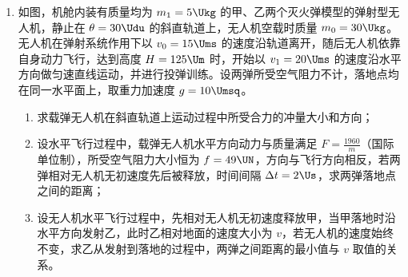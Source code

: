\documentclass[\gkver]{gaokaozhenti}
\begin{document}
\begin{enumerate}
{可知小球做加速度减小的加速运动，小球从静止释放时加速度为 $g$，小球运动到 M 点加恒定匀强电场时有 $qE+kv_{0}-mg=ma_{\max}$

解得 $a_{\max}=2g>g$

则小球的最大加速度大小为 $2g$。

（3）对小球从 M 点运动到 N 点的过程，由动能定理有 $qU_{MN}-mgh-W_{f}=0$

其中 $U_{MN}=Eh$

联立解得 M、N 两点间的电势差为 $U_{MN}=\frac{2W_{f}}{q}$。
}
\item
如图，机舱内装有质量均为 $m_{1}=5\Ukg$ 的甲、乙两个灭火弹模型的弹射型无人机，静止在 $\theta=30\Udu$ 的斜直轨道上，无人机空载时质量 $m_{0}=30\Ukg$。无人机在弹射系统作用下以 $v_{0}=15\Ums$ 的速度沿轨道离开，随后无人机依靠自身动力飞行，达到高度 $H=125\Um$ 时，开始以 $v_{1}=20\Ums$ 的速度沿水平方向做匀速直线运动，并进行投弹训练。设两弹所受空气阻力不计，落地点均在同一水平面上，取重力加速度 $g=10\Umsq$。
\begin{enumerate}
	\item
	求载弹无人机在斜直轨道上运动过程中所受合力的冲量大小和方向；
	\item
	设水平飞行过程中，载弹无人机水平方向动力与质量满足 $F=\frac{1960}{m}$（国际单位制），所受空气阻力大小恒为 $f=49\UN$，方向与飞行方向相反，若两弹相对无人机无初速度先后被释放，时间间隔 $\Delta t=2\Us$，求两弹落地点之间的距离；
	\item
	设无人机水平飞行过程中，先相对无人机无初速度释放甲，当甲落地时沿水平方向发射乙，此时乙相对地面的速度大小为 $v$，若无人机的速度始终不变，求乙从发射到落地的过程中，两弹之间距离的最小值与 $v$ 取值的关系。
\end{enumerate}

\end{enumerate}
\end{document}
